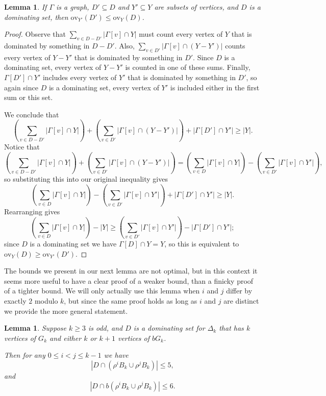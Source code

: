 \documentclass{amsart}
\newtheorem{lem}[thm]{Lemma}
\theoremstyle{remark}
\theoremstyle{definition}
\newcommand{\ov}{\mathrm{ov}}
\begin{document}
\begin{lem}\label{overlapping-subset}
    If $\Gamma$ is a graph, $D' \subseteq D$ and $Y' \subseteq Y$ are subsets of vertices, and $D$ is a dominating set, then $\ov_{Y'}(D') \le \ov_Y(D)$.
\end{lem}

\begin{proof}
    Observe that $\sum_{v \in D-D'} |\Gamma[v]\cap Y|$ must count every vertex of $Y$ that is dominated by something in $D-D'$. Also, $\sum_{v \in D'}|\Gamma[v]\cap(Y-Y')|$ counts every vertex of $Y-Y'$ that is dominated by something in $D'$. Since $D$ is a dominating set, every vertex of $Y-Y'$ is counted in one of these sums. Finally, $\Gamma[D']\cap Y'$ includes every vertex of $Y'$ that is dominated by something in $D'$, so again since $D$ is a dominating set, every vertex of $Y'$ is included either in the first sum or this set.

    We conclude that $$\left(\sum_{v \in D-D'} |\Gamma[v]\cap Y|\right)+\left(\sum_{v \in D'}|\Gamma[v]\cap(Y-Y')|\right)+|\Gamma[D']\cap Y'| \ge |Y|.$$
    Notice that $$\left(\sum_{v \in D-D'} |\Gamma[v]\cap Y|\right)+\left(\sum_{v \in D'}|\Gamma[v]\cap(Y-Y')|\right)=\left(\sum_{v \in D}|\Gamma[v]\cap Y|\right)-\left(\sum_{v \in D'} |\Gamma[v]\cap Y'|\right),$$ so substituting this into our original inequality gives
    $$\left(\sum_{v \in D}|\Gamma[v]\cap Y|\right)-\left(\sum_{v \in D'} |\Gamma[v]\cap Y'|\right)+|\Gamma[D']\cap Y'| \ge |Y|.$$
    Rearranging gives $$\left(\sum_{v \in D}|\Gamma[v]\cap Y|\right)-|Y|\ge \left(\sum_{v \in D'} |\Gamma[v]\cap Y'|\right)-|\Gamma[D']\cap Y'|;$$ since $D$ is a dominating set we have $\Gamma[D]\cap Y=Y$, so this is equivalent to $\ov_Y(D)\ge \ov_{Y'}(D')$.
\end{proof}

The bounds we present in our next lemma are not optimal, but in this context it seems more useful to have a clear proof of a weaker bound, than a finicky proof of a tighter bound. We will only actually use this lemma when $i$ and $j$ differ by exactly $2$ modulo $k$, but since the same proof holds as long as $i$ and $j$ are distinct we provide the more general statement.

\begin{lem}\label{rows-small}
    Suppose $k \ge 3$ is odd, and $D$ is a dominating set for $\Delta_k$ that has $k$ vertices of $G_k$ and either $k$ or $k+1$ vertices of $bG_k$.

    Then for any $0 \le i<j \le k-1$ we have $$|D\cap (\rho^iB_k\cup \rho^jB_k)| \le 5,$$ and
    $$|D \cap b(\rho^iB_k\cup \rho^jB_k)| \le 6.$$
\end{lem}
\end{document}
